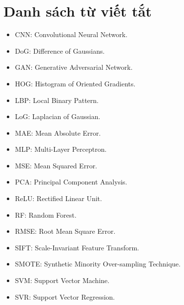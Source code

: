 \cleardoublepage
\chapter*{Danh sách từ viết tắt}

{\fontsize{14pt}{18pt}\selectfont
\begin{itemize}
    \item CNN: Convolutional Neural Network.
    \item DoG: Difference of Gaussians.
    \item GAN: Generative Adversarial Network.
    \item HOG: Histogram of Oriented Gradients.
    \item LBP: Local Binary Pattern.
    \item LoG: Laplacian of Gaussian.
    \item MAE: Mean Absolute Error.
    \item MLP: Multi-Layer Perceptron.
    \item MSE: Mean Squared Error.
    \item PCA: Principal Component Analysis.
    \item ReLU: Rectified Linear Unit.
    \item RF: Random Forest.
    \item RMSE: Root Mean Square Error.
    \item SIFT: Scale-Invariant Feature Transform.
    \item SMOTE: Synthetic Minority Over-sampling Technique.
    \item SVM: Support Vector Machine.
    \item SVR: Support Vector Regression.
\end{itemize}
}
